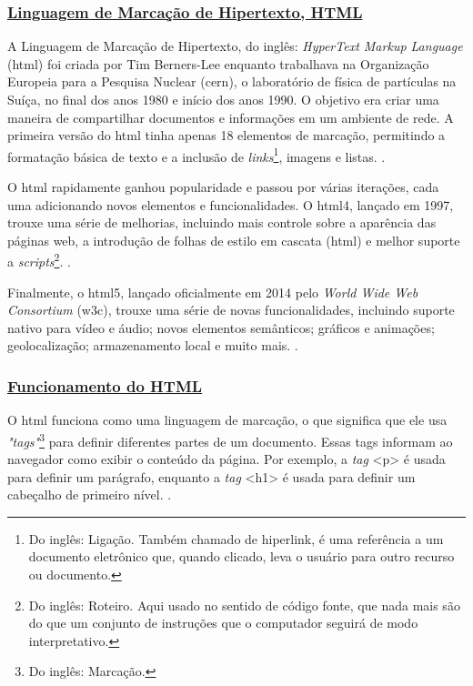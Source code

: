 \subsubsection{\underline{Linguagem de Marcação de Hipertexto, HTML}}

A Linguagem de Marcação de Hipertexto, do inglês: \textit{HyperText Markup Language}
(\acrshort{html})
foi criada por Tim Berners-Lee enquanto trabalhava na Organização Europeia para a
Pesquisa Nuclear
(\acrshort{cern}),
o laboratório de física de partículas na Suíça, no final dos anos
1980 e início dos anos 1990. O objetivo era criar uma maneira de compartilhar documentos e
informações em um ambiente de rede. A primeira versão do
\acrshort{html}
tinha apenas 18 elementos
de marcação, permitindo a formatação básica de texto e a inclusão de
\textit{links}\footnote{Do inglês: Ligação. Também chamado de hiperlink, é uma referência a um
    documento eletrônico que, quando clicado, leva o usuário para outro recurso
    ou documento.
},
imagens e listas.
\cite{w3c}.

O
\acrshort{html}
rapidamente ganhou popularidade e passou por várias iterações, cada uma
adicionando novos elementos e funcionalidades. O
\acrshort{html}4,
lançado em 1997, trouxe uma
série de melhorias, incluindo mais controle sobre a aparência das páginas web, a introdução
de folhas de estilo em cascata
(\acrshort{html})
e melhor suporte a
\textit{scripts}\footnote{Do inglês: Roteiro. Aqui usado no sentido de código fonte, que nada mais são
    do que um conjunto de instruções que o computador seguirá de modo interpretativo.
}.
\cite{w3c}.

Finalmente, o
\acrshort{html}5,
lançado oficialmente em 2014 pelo
\textit{World Wide Web Consortium}
(\acrshort{w3c}), trouxe uma série de novas funcionalidades, incluindo suporte nativo para
vídeo e áudio; novos elementos semânticos; gráficos e animações; geolocalização;
armazenamento local e muito mais.
\cite{w3c}.

\subsubsection{\underline{Funcionamento do HTML}}

O
\acrshort{html}
funciona como uma linguagem de marcação, o que significa que ele usa
\textit{"tags"}\footnote{Do inglês: Marcação.
}
para definir diferentes partes de um documento. Essas tags informam ao navegador
como exibir o conteúdo da página. Por exemplo, a \textit{tag}
<p>
é usada para definir um parágrafo,
enquanto a \textit{tag}
<h1>
é usada para definir um cabeçalho de primeiro nível.
\cite{w3c}.

